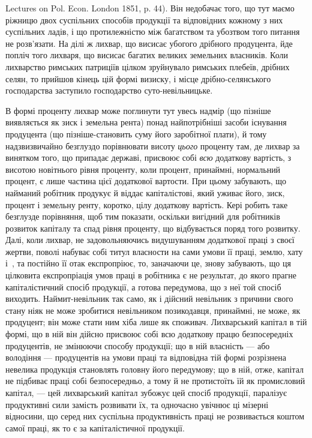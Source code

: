 \parcont{}  %
Lectures on Pol. Econ. London 1851, p. 44). Він недобачає того, що тут маємо
ріжницю двох суспільних способів продукції та відповідних кожному з них
суспільних ладів, і що протилежністю між багатством та убозтвом того питання
не розв’язати. На ділі ж лихвар, що висисає убогого дрібного продуцента, йде
попліч того лихваря, що висисає багатих великих земельних власників. Коли
лихварство римських патриціїв цілком зруйнувало римських плебеїв, дрібних
селян, то прийшов кінець цій формі визиску, і місце дрібно-селянського господарства
заступило господарство суто-невільницьке.

В формі проценту лихвар може поглинути тут увесь надмір (що пізніше
виявляється як зиск і земельна рента) понад найпотрібніші засоби існування
продуцента (що пізніше-становить суму його заробітної плати), й тому надзвизвичайно
безглуздо порівнювати висоту \emph{цього} проценту там, де лихвар за винятком
того, що припадає державі, присвоює собі \emph{всю} додаткову вартість, з висотою
новітнього рівня проценту, коли процент, принаймні, нормальний процент, є лише
частина цієї додаткової вартости. При цьому забувають, що найманий робітник
продукує й віддає капіталістові, який уживає його, зиск, процент і земельну
ренту, коротко, цілу додаткову вартість. Кері робить таке безглузде порівняння,
щоб тим показати, оскільки вигідний для робітників розвиток капіталу та спад
рівня проценту, що відбувається поряд того розвитку. Далі, коли лихвар, не
задовольняючись видушуванням додаткової праці з своєї жертви, поволі набуває
собі титул власности на сами умови її праці, землю, хату і~, та постійно
її отак експропріює, то, заначаючи це, знову забувають, що ця цілковита експропріація
умов праці в робітника є не результат, до якого прагне капіталістичний
спосіб продукції, а готова передумова, що з неї той спосіб виходить. Наймит-невільник
так само, як і дійсний невільник з причини свого стану ніяк не може
зробитися невільником позикодавця, принаймні, не може, як продуцент; він може
стати ним хіба лише як споживач. Лихварський капітал в тій формі, що в ній
він дійсно присвоює собі всю додаткову працю безпосередніх продуцентів, не
змінюючи способу продукції; що в ній власність — або володіння — продуцентів
на умови праці та відповідна тій формі розрізнена невелика продукція становлять
головну його передумову; що в ній, отже, капітал не підбиває праці собі безпосередньо,
а тому й не протистоїть їй як промисловий капітал, — цей лихварський
капітал зубожує цей спосіб продукції, паралізує продуктивні сили
замість розвивати їх, та одночасно увічнює ці мізерні відносини, що серед них
суспільна продуктивність праці не розвивається коштом самої праці, як то є за
капіталістичної продукції.

